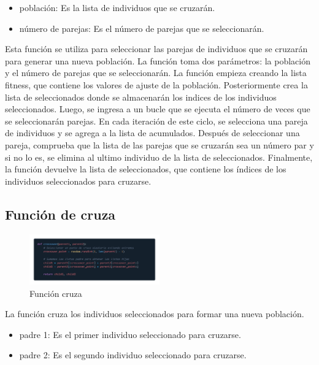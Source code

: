\documentclass{report}
\begin{document}
    \begin{itemize}
        \item población: Es la lista de individuos que se cruzarán.
        \item número de parejas: Es el número de parejas que se seleccionarán.
    \end{itemize}
    
    Esta función se utiliza para seleccionar las parejas de individuos que se cruzarán para generar una nueva población. La función toma dos parámetros: la población y el número de parejas que se seleccionarán.
    La función empieza creando la lista fitness, que contiene los valores de ajuste de la población. Posteriormente crea la lista de seleccionados donde se almacenarán los indices de los individuos seleccionados.
    Luego, se ingresa a un bucle que se ejecuta el número de veces que se seleccionarán parejas. En cada iteración de este ciclo, se selecciona una pareja de individuos y se agrega a la lista de acumulados.
    Después de seleccionar una pareja, comprueba que la lista de las parejas que se cruzarán sea un número par y si no lo es, se elimina al ultimo individuo de la lista de seleccionados.
    Finalmente, la función devuelve la lista de seleccionados, que contiene los índices de los individuos seleccionados para cruzarse.
    
    \newpage
    \subsection*{Función de cruza}
    \begin{figure}[h]
        \centering
        \includegraphics[width=0.5\textwidth]{funcionCruza.png}
        \caption{Función cruza}
    \end{figure}

    La función cruza los individuos seleccionados para formar una nueva población.

    \begin{itemize}
        \item padre 1: Es el primer individuo seleccionado para cruzarse.
        \item padre 2: Es el segundo individuo seleccionado para cruzarse.
    \end{itemize}
\end{document}
